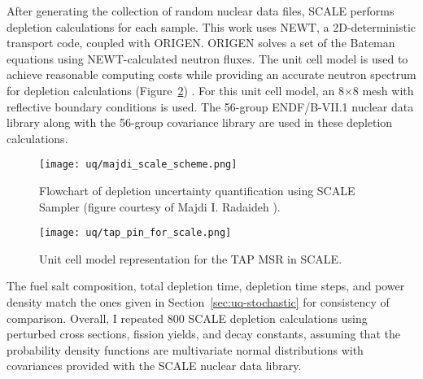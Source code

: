 After generating the collection of random nuclear data files, SCALE performs 
depletion calculations for each sample. This work uses NEWT, a
2D-deterministic transport code, coupled with ORIGEN. ORIGEN solves a set of 
the Bateman equations using NEWT-calculated neutron fluxes. The unit cell 
model is used to achieve reasonable computing costs while providing an 
accurate neutron spectrum for depletion calculations 
(Figure~\ref{fig:uq-tap-pincell}) \cite{betzler_molten_2017, 
	rykhlevskii_fuel_2019, betzler_modeling_2020}. For this unit cell model, an 
8$\times$8 mesh with reflective boundary conditions is used. The 56-group 
ENDF/B-VII.1 nuclear data library along with the 56-group covariance library 
are used in these depletion calculations. 
\begin{figure}[htp!] %
	\centering
	\texttt{[image: uq/majdi\_scale\_scheme.png]}
	\caption{Flowchart of depletion uncertainty quantification 
		using SCALE Sampler (figure courtesy of Majdi I. Radaideh 
		\cite{radaideh_novel_2019}).}
	\label{fig:uq-sampler}
\end{figure}
\vspace{-7mm}
\begin{figure}[hbp!] %
	\centering
	\texttt{[image: uq/tap\_pin\_for\_scale.png]}
	\caption{Unit cell model representation for the \gls{TAP} \gls{MSR} in 
		SCALE.}
	\label{fig:uq-tap-pincell}
\end{figure}

The fuel salt composition, total depletion time, depletion time steps, and 
power density match the ones given in Section~\ref{sec:uq-stochastic} for 
consistency of comparison. Overall, I repeated 800 SCALE depletion 
calculations using perturbed cross sections, fission yields, and decay 
constants, assuming that the probability density functions are multivariate 
normal distributions with covariances provided with the SCALE nuclear data 
library.


